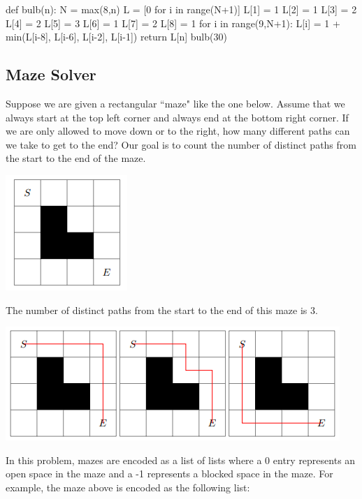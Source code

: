 \documentclass{ximera}
\begin{document}
\begin{sageCell}
def bulb(n):
        N = max(8,n)
        L = [0 for i in range(N+1)]
        L[1] = 1
        L[2] = 1
        L[3] = 2
        L[4] = 2
        L[5] = 3
        L[6] = 1
        L[7] = 2
        L[8] = 1
        for i in range(9,N+1):
                L[i] = 1 + min(L[i-8], L[i-6], L[i-2], L[i-1])
        return L[n]
bulb(30)
\end{sageCell}

\subsection{Maze Solver}

Suppose we are given a rectangular ``maze" like the one below. Assume that we always start at the top left corner and always end at the bottom right corner. If we are only allowed to move down or to the right, how many different paths can we take to get to the end? Our goal is to count the number of distinct paths from the start to the end of the maze.

\begin{center}
\includegraphics{maze_example.png} 
\end{center}

The number of distinct paths from the start to the end of this maze is 3.

\begin{center}
\includegraphics{maze_example_solutions.png}
\end{center}

In this problem, mazes are encoded as a list of lists where a 0 entry represents an open space in the maze and a -1 represents a blocked space in the maze. For example, the maze above is encoded as the following list:
\end{document}
